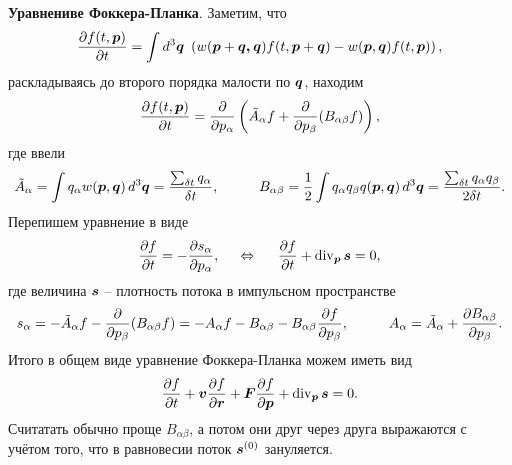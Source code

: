 \textbf{Уравнениве Фоккера-Планка}.
Заметим, что
\begin{equation*}
	\frac{\partial f(t, \boldsymbol{p})}{\partial t} =  \int d^3 \boldsymbol{q}\
	\left(
		w(\boldsymbol{p}+\boldsymbol{\boldsymbol{q},q}) f(t, \boldsymbol{p}+\boldsymbol{q}) - w(\boldsymbol{p}, \boldsymbol{q}) f(t, \boldsymbol{p})
	\right),
\end{equation*}
раскладываясь до второго порядка малости по $\boldsymbol{q}$, находим
\begin{equation*}
	\frac{\partial f(t, \boldsymbol{p})}{\partial t}  = 
	\frac{\partial }{\partial p_\alpha} \left(
		\tilde{A}_\alpha f + \frac{\partial }{\partial p_\beta} (B_{\alpha \beta} f)
	\right),
\end{equation*}
где ввели
\begin{equation*}
	\tilde{A}_\alpha = \int q_\alpha w(\vc{p}, \vc{q}) \d^3 \vc{q} = \frac{\sum_{\delta t} q_\alpha}{\delta t},
	\hspace{10 mm} 
	B_{\alpha \beta} = \frac{1}{2} \int q_\alpha q_\beta q(\vc{p}, \vc{q}) \d^3 \vc{q} = \frac{\sum_{\delta t} q_\alpha q_\beta}{2 \delta t}.
\end{equation*}
Перепишем уравнение в виде
\begin{equation*}
	\frac{\partial f}{\partial t}  = - \frac{\partial s_\alpha}{\partial p_\alpha},
	\hspace{5 mm} \Leftrightarrow \hspace{5 mm} 
	\frac{\partial f}{\partial t}  + \mathop{\mathrm{div}}\nolimits_{\boldsymbol{p}} \boldsymbol{s} = 0,
\end{equation*}
где величина $\boldsymbol{s}$ -- плотность потока в импульсном пространстве
\begin{equation*}
	s_\alpha = - \tilde{A}_\alpha f - \frac{\partial }{\partial p_\beta} (B_{\alpha \beta} f) = - A_\alpha f - B_{\alpha \beta} - B_{\alpha \beta} \frac{\partial f}{\partial p_\beta},
	\hspace{10 mm} 
	A_\alpha = \tilde{A}_\alpha + \frac{\partial B_{\alpha \beta}}{\partial p_\beta}.
\end{equation*}
Итого в общем виде уравнение Фоккера-Планка можем иметь вид
\begin{equation}
	\frac{\partial f}{\partial t} + \boldsymbol{v} \frac{\partial f}{\partial \boldsymbol{r}} + \boldsymbol{F} \frac{\partial f}{\partial \boldsymbol{p}} + \mathop{\mathrm{div}}\nolimits_{\boldsymbol{p}} \boldsymbol{s} = 0.
\end{equation}
Считатать обычно проще $B_{\alpha \beta}$, а потом они друг через друга выражаются с учётом того, что в равновесии поток $\boldsymbol{s}^{(0)}$ зануляется.



